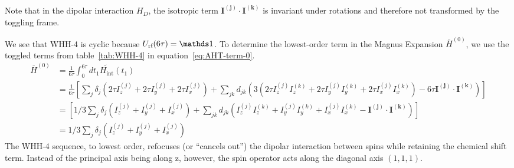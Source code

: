 Note that in the dipolar interaction $H_D$, the isotropic term $\mathbf{I^{(j)}} \cdot \mathbf{I^{(k)}}$ is invariant under rotations and therefore not transformed by the toggling frame.

We see that WHH-4 is cyclic because $U_{\text{rf}}(6\tau) = \identity$. To determine the lowest-order term in the Magnus Expansion $\overline{H}^{(0)}$, we use the toggled terms from table~\ref{tab:WHH-4} in equation~\ref{eq:AHT-term-0}.
\begin{align*}
    \overline{H}^{(0)} &= \frac{1}{6\tau} \int_0^{6\tau} dt_1
    \widetilde{H_{\text{int}}}(t_1) \\
    &= \frac{1}{6\tau} \left[
        \sum_j \delta_j \left(2\tau I_z^{(j)} + 2\tau I_y^{(j)} + 2\tau I_x^{(j)} \right) +
        \sum_{jk} d_{jk} \left(3(
            2\tau I_z^{(j)}I_z^{(k)} + 2\tau I_y^{(j)}I_y^{(k)} + 2\tau I_x^{(j)}I_x^{(k)}
        ) - 6\tau \mathbf{I^{(j)}} \cdot \mathbf{I^{(k)}} \right)
    \right] \\
    &= \left[
        1/3 \sum_j \delta_j \left(I_z^{(j)} + I_y^{(j)} + I_x^{(j)} \right) +
        \sum_{jk} d_{jk} \left(I_z^{(j)}I_z^{(k)} + I_y^{(j)}I_y^{(k)} + I_x^{(j)}I_x^{(k)} - \mathbf{I^{(j)}} \cdot \mathbf{I^{(k)}} \right)
    \right] \\
    &= \boxed{1/3 \sum_j \delta_j \left(I_z^{(j)} + I_y^{(j)} + I_x^{(j)} \right)}
\end{align*}
The WHH-4 sequence, to lowest order, refocuses (or ``cancels out'') the dipolar interaction between spins while retaining the chemical shift term. Instead of the principal axis being along z, however, the spin operator acts along the diagonal axis $(1,1,1)$.



%
%




